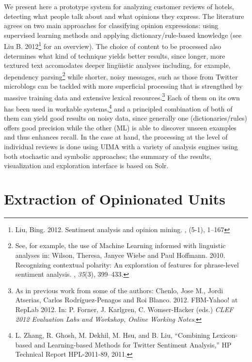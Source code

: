 \documentclass{llncs}
\begin{document}
We present here a prototype system for analyzing customer reviews of hotels, detecting what people talk about and what opinions they express. The literature agrees on two main approaches for classifying opinion expressions: using supervised learning methods and applying dictionary/rule-based knowledge (see Liu B. 2012\footnote{Liu, Bing. 2012. \newblock Sentiment analysis and opinion mining. , (5-1), 1--167} for an overview). The choice of content to be processed also determines what kind of technique yields better results, since longer, more textured text accomodates deeper lingüistic analyses including, for example, dependency parsing\footnote{See, for example, the use of Machine Learning informed with linguistic analyses in: Wilson, Theresa, Janyce Wiebe and Paul Hoffmann. 2010.
\newblock Recognizing contextual polarity: An exploration of features for
  phrase-level sentiment analysis.
, {\em 35\/}(3), 399--433.} while shorter, noisy messages, such as those from Twitter microblogs can be tackled with more superficial processing that is strengthed by massive training data and extensive lexical resources.\footnote{As in previous work from some of the authors: Chenlo, Jose M., Jordi Atserias, Carlos Rodríguez-Penagos and Roi Blanco. 2012.
\newblock  FBM-Yahoo! at RepLab 2012.
\newblock In: P. Forner, J. Karlgren, C. Womser-Hacker (eds.) {\em CLEF 2012 Evaluation Labs and Workshop, Online Working Notes}.}  Each of them on its own has been used in workable systems,\footnote{L. Zhang, R. Ghosh, M. Dekhil, M. Hsu, and B. Liu, “Combining Lexicon-based and Learning-based Methods for Twitter Sentiment Analysis,” HP Technical Report HPL-2011-89, 2011.
} and a principled combination of both of them can yield good results on noisy data, since generally one (dictionaries/rules) offers good precision while the other (ML) is able to discover unseen examples and thus enhances recall. In the case at hand, the processing at the level of individual reviews is done using UIMA with a variety of analysis engines using both stochastic and symbolic approaches; the summary of the results, visualization and exploration interface is based on Solr.

\section{Extraction of Opinionated Units}
\end{document}

